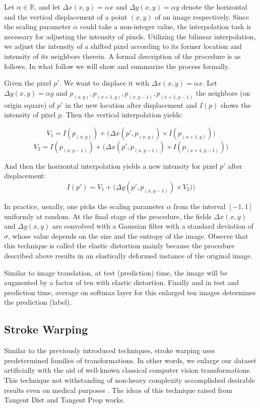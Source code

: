 Let $\alpha \in \mathbb{R}$, and let $\Delta x(x,  y) = \alpha x$ and $\Delta y(x,  y) = \alpha y$
denote the horizontal and the vertical displacement of a point $(x, y)$ of an image respectively.
Since the scaling parameter $\alpha$ could take a non-integer value, the interpolation task is
necessary for adjusting the intensity of pixels. Utilizing the bilinear interpolation, we adjust the
intensity of a shifted pixel according to its former location and intensity of its neighbors
therein. A formal description of the procedure is as follows. In what follow we will show and summarize the
process formally.

\begin{definition}{}
  Given the pixel $p'$. We want to displace it with $\Delta x(x,y)= \alpha x$. Let $\Delta y(x,y)= \alpha y$ and $p_{(x,y)}, p_{(x+1,y)}, p_{(x,y-1)}, p_{(x+1,y-1)}$ the neighbors (on
  origin square) of $p'$ in the new location after displacement and $I(p)$ shows the intensity of pixel $p$. Then the vertical interpolation yields:

  $$V_1 = I(p_{(x,y)}) + \big( \Delta x(p', p_{(x,y)}) \times I(p_{(x+1,y)}) \big)$$
  $$V_2 = I(p_{(x,y-1)}) + \big( \Delta x(p', p_{(x,y-1)}) \times I(p_{(x+1,y-1)}) \big)$$

  And then the horizontal interpolation yields a new intensity for pixel $p'$ after displacement:
  $$I(p') = V_1 + \big( \Delta y(p', p_{(x,y-1)}) \times V_2) \big)$$
\end{definition}

In practice, usually, one picks the scaling parameter $\alpha$ from the interval $[-1, 1]$ uniformly
at random. At the final stage of the procedure, the fields  $\Delta x(x,  y)$ and $\Delta y(x,  y)$
are convolved with a Gaussian filter with a standard deviation of $\sigma$, whose value depends on
the size and the entropy of the image. Observe that this technique is called the elastic distortion
mainly because the procedure described above results in an elastically deformed instance
of the original image.

Similar to image translation, at test (prediction) time, the image will be augmented by a factor of
ten with elastic distortion. Finally and in test and prediction time, average on softmax layer for
this enlarged ten images determines the prediction (label).

\subsection{Stroke Warping}
\label{tit:stroke-warping}
Similar to the previously introduced techniques, stroke warping uses predetermined families of transformations.
In other words, we enlarge our dataset artificially with the aid of well-known classical computer
vision transformations. This technique not withstanding of non-heavy complexity accomplished desirable
results even on medical purposes \cite{stroke_tumor}. The ideas of this technique raised from Tangent
Dist \cite{stroke_idea_1992} and Tangent Prop \cite{stroke_idea_1993} works.

